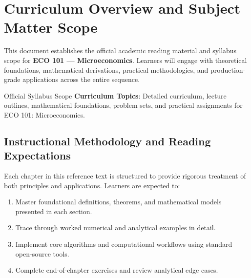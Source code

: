\section{Curriculum Overview and Subject Matter Scope}

This document establishes the official academic reading material and syllabus scope for \textbf{ECO 101 --- Microeconomics}. Learners will engage with theoretical foundations, mathematical derivations, practical methodologies, and production-grade applications across the entire sequence.

\begin{InsightBox}{Official Syllabus Scope}
  \textbf{Curriculum Topics}: Detailed curriculum, lecture outlines, mathematical foundations, problem sets, and practical assignments for ECO 101: Microeconomics.
\end{InsightBox}

\subsection{Instructional Methodology and Reading Expectations}

Each chapter in this reference text is structured to provide rigorous treatment of both principles and applications. Learners are expected to:
\begin{enumerate}
  \item Master foundational definitions, theorems, and mathematical models presented in each section.
  \item Trace through worked numerical and analytical examples in detail.
  \item Implement core algorithms and computational workflows using standard open-source tools.
  \item Complete end-of-chapter exercises and review analytical edge cases.
\end{enumerate}

